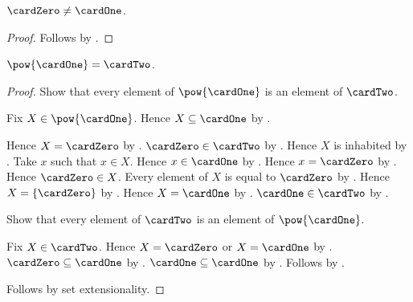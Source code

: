 \begin{proposition}\label{cardinal_zero_neq_one}
    $\cardZero\neq\cardOne$.
\end{proposition}
\begin{proof}
    Follows by
        .
\end{proof}

\begin{proposition}\label{powerset_cardinal_one}
    $\pow{\cardOne}=\cardTwo$.
\end{proposition}
\begin{proof}
    Show that every element of $\pow{\cardOne}$ is an element of
        $\cardTwo$.
    \begin{subproof}
        Fix $X\in\pow{\cardOne}$.
        Hence $X\subseteq\cardOne$ by .
        \begin{byCase}
                Hence $X=\cardZero$ by .
                $\cardZero\in\cardTwo$
                    by .
                Hence $X$ is inhabited by .
                Take $x$ such that $x\in X$.
                Hence $x\in\cardOne$ by .
                Hence $x=\cardZero$
                    by
                    .
                Hence $\cardZero\in X$.
                Every element of $X$ is equal to $\cardZero$
                    by
                    .
                Hence $X=\{\cardZero\}$ by .
                Hence $X=\cardOne$
                    by .
                $\cardOne\in\cardTwo$
                    by .
        \end{byCase}
    \end{subproof}
    Show that every element of $\cardTwo$ is an element of
        $\pow{\cardOne}$.
    \begin{subproof}
        Fix $X\in\cardTwo$.
        Hence $X=\cardZero$ or $X=\cardOne$
            by .
        $\cardZero\subseteq\cardOne$
            by .
        $\cardOne\subseteq\cardOne$ by .
        Follows by .
    \end{subproof}
    Follows by set extensionality.
\end{proof}

